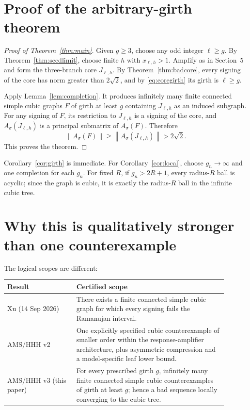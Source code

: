 \documentclass[11pt]{article}
\newcommand{\sgn}{\sigma}
\newcommand{\norm}[1]{\left\lVert #1\right\rVert}
\begin{document}
\section{Proof of the arbitrary-girth theorem}

\begin{proof}[Proof of Theorem~\ref{thm:main}]
Given $g\ge3$, choose any odd integer $\ell\ge g$.  By Theorem~\ref{thm:seedlimit}, choose finite $h$ with $x_{\ell,h}>1$.  Amplify as in Section~5 and form the three-branch core $J_{\ell,h}$.  By Theorem~\ref{thm:badcore}, every signing of the core has norm greater than $2\sqrt2$, and by \eqref{eq:coregirth} its girth is $\ell\ge g$.

Apply Lemma~\ref{lem:completion}.  It produces infinitely many finite connected simple cubic graphs $F$ of girth at least $g$ containing $J_{\ell,h}$ as an induced subgraph.  For any signing of $F$, its restriction to $J_{\ell,h}$ is a signing of the core, and $A_\sgn(J_{\ell,h})$ is a principal submatrix of $A_\sgn(F)$.  Therefore
\[
 \norm{A_\sgn(F)}\ge\norm{A_\sgn(J_{\ell,h})}>2\sqrt2.
\]
This proves the theorem.
\end{proof}

Corollary~\ref{cor:girth} is immediate.  For Corollary~\ref{cor:local}, choose $g_n\to\infty$ and one completion for each $g_n$.  For fixed $R$, if $g_n>2R+1$, every radius-$R$ ball is acyclic; since the graph is cubic, it is exactly the radius-$R$ ball in the infinite cubic tree.

\section{Why this is qualitatively stronger than one counterexample}

The logical scopes are different:

\begin{center}
\begin{tabular}{p{0.29\linewidth}p{0.61\linewidth}}
\toprule
Result & Certified scope \\
\midrule
Xu (14 Sep 2026) & There exists a finite connected simple cubic graph for which every signing fails the Ramanujan interval. \\
AMS/HHH v2 & One explicitly specified cubic counterexample of smaller order within the response-amplifier architecture, plus asymmetric compression and a model-specific leaf lower bound. \\
AMS/HHH v3 (this paper) & For every prescribed girth $g$, infinitely many finite connected simple cubic counterexamples of girth at least $g$; hence a bad sequence locally converging to the cubic tree. \\
\bottomrule
\end{tabular}
\end{center}
\end{document}
